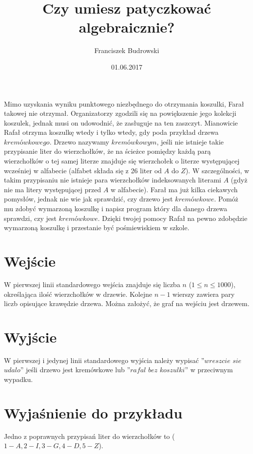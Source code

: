 \documentclass[zad,zawodnik,utf8]{sinol}
\title{Czy umiesz patyczkować algebraicznie?}
\author{Franciszek Budrowski} %
\date{01.06.2017}
\begin{document}
\begin{tasktext}

\iffalse
\epigraph{Man wollte sie zu zwanzig Dingen \\ in einem Haus in Danzig zwingen.}{\textit{Erich Mühsam}}
Danzig sei deutsch!
Danzig, gerissen vom Mutterlande,
Stehst du allein nach der Feinde Gebot.
Danzig, du Perle am Ostseestrande,
Weh klingt deine Klage: Deutschtum in Not!
Deutschtum in Not – Danzig in Not!
Im Staube das Banner schwarz-weiß-rot! 
\fi


Mimo uzyskania wyniku punktowego niezbędnego do otrzymania koszulki, Farał takowej nie otrzymał. Organizatorzy zgodzili się na powiększenie jego kolekcji koszulek, jednak musi on udowodnić, że zasługuje na ten zaszczyt.
 Mianowicie Rafał otrzyma koszulkę wtedy  i tylko wtedy, gdy poda przykład drzewa $kremówkowego$. Drzewo nazywamy $kremówkowym$, jeśli  nie istnieje takie przypisanie liter do wierzchołków, że na ścieżce pomiędzy każdą parą wierzchołków o tej samej literze znajduje się wierzchołek o literze występującej wcześniej w alfabecie (alfabet składa się z 26 liter od $A$ do $Z$).  W szczególności, w takim przypisaniu nie istnieje para wierzchołków indeksowanych literami $A$ (gdyż nie ma litery występującej przed $A$ w alfabecie). Farał ma już kilka ciekawych pomysłów, jednak nie wie jak sprawdzić, czy drzewo jest $kremówkowe$. Pomóż mu zdobyć wymarzoną koszulkę i napisz program który dla danego drzewa sprawdzi, czy jest $kremówkowe$. Dzięki twojej pomocy Rafał na pewno zdobędzie wymarzoną koszulkę i przestanie być pośmiewiskiem w szkole.

  \section{Wejście}
W pierwszej linii standardowego wejścia znajduje się liczba $n$ ($1 \leq n \leq 1000$), określająca ilość wierzchołków w drzewie. Kolejne $n-1$ wierszy zawiera pary liczb opisujące krawędzie drzewa. Można założyć, że graf na wejściu jest drzewem.


	\section{Wyjście}
W pierwszej i jedynej linii standardowego wyjścia należy wypisać ''$wreszcie$ $sie$ $udalo$'' jeśli drzewo jest kremówkowe lub ''$rafal$ $bez$ $koszulki$''  w przeciwnym wypadku.
	\makecompactexample


	\section{Wyjaśnienie do przykładu}
	Jedno z poprawnych przypisań liter do wierzchołków to ($1-A,2-I,3-G,4-D,5-Z$).
\end{tasktext}
\end{document}
